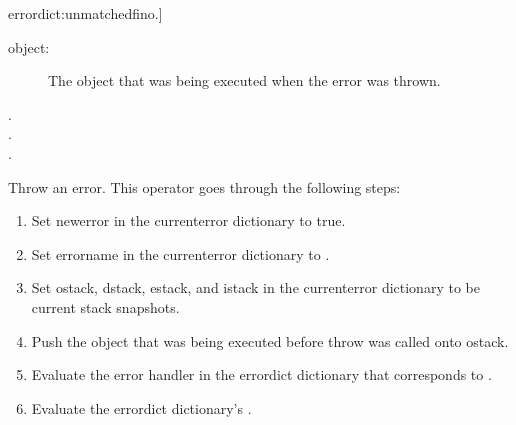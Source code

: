 \begin{description}
\begin{description}
\begin{description}
\begin{description}
			{errordict:unmatchedfino}.]
			\item[\htmlref{\onyxop{}{unregistered}{}}
			{errordict:unregistered}.]
			\end{description}
		\end{description}
	\item[Output(s): ]
		\begin{description}\item[]
		\item[object: ]
			The object that was being executed when the error was
			thrown.
		\end{description}
	\item[Errors(s): ]
		\begin{description}\item[]
		\item[.]
		\item[.]
		\item[.]
		\end{description}
	\item[Description: ]
		Throw an error.  This operator goes through the following steps:
		\begin{enumerate}
		\item{Set newerror in the currenterror dictionary to true.}
		\item{Set errorname in the currenterror dictionary to
		.}
		\item{Set ostack, dstack, estack, and istack in the currenterror
		dictionary to be current stack snapshots.}
		\item{Push the object that was being executed before throw was
		called onto ostack.}
		\item{Evaluate the error handler in the errordict dictionary
		that corresponds to .}
		\item{Evaluate the errordict dictionary's
		.}
		\end{enumerate}
	\item[Example(s): ]\begin{verbatim}


\end{verbatim}
\end{description}
\end{description}
